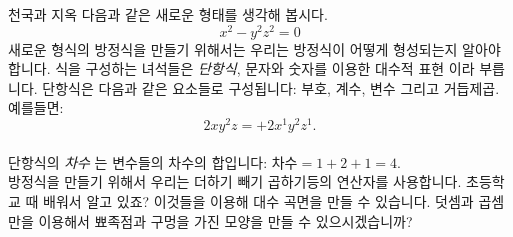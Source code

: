 \begin{surferPage}{천국과 지옥}
다음과 같은 새로운 형태를 생각해 봅시다. \\
\smallskip
\[x^2	- y^2z^2	= 0\]
\singlespacing
새로운 형식의 방정식을 만들기 위해서는 우리는 방정식이 어떻게 형성되는지 알아야 합니다. 식을 구성하는 녀석들은 {\it 단항식}, 문자와 숫자를 이용한 대수적 표현 이라 부릅니다.
\singlespacing
단항식은 다음과 같은 요소들로 구성됩니다:
부호, 계수, 변수 그리고 거듭제곱. \\
\singlespacing
예를들면: 
\smallskip
\[2xy^2z = +2x^1y^2z^1.\]
\\
\smallskip
단항식의 {\it 차수} 는 변수들의 차수의 합입니다: $차수 = 1+2+1=4$.  \\
\singlespacing
방정식을 만들기 위해서 우리는 더하기 빼기 곱하기등의 연산자를 사용합니다. 초등학교 때 배워서 알고 있죠? 이것들을 이용해 대수 곡면을 만들 수 있습니다.   
\singlespacing
덧셈과 곱셈만을 이용해서 뾰족점과 구멍을 가진 모양을 만들 수 있으시겠습니까?
\end{surferPage}
